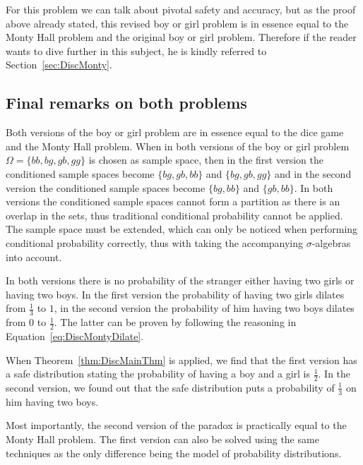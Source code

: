 \documentclass[a4paper]{report}
\theoremstyle{plain}
\theoremstyle{definition}
\theoremstyle{remark}
\numberwithin{equation}{chapter}
\DeclareMathOperator{\1}{\mathbbm{1}}
\begin{document}
For this problem we can talk about pivotal safety and accuracy, but as the proof above already stated, this revised boy or girl problem is in essence equal to the Monty Hall problem and the original boy or girl problem. Therefore if the reader wants to dive further in this subject, he is kindly referred to Section~\ref{sec:DiscMonty}.

\subsection{Final remarks on both problems}
Both versions of the boy or girl problem are in essence equal to the dice game and the Monty Hall problem. When in both versions of the boy or girl problem $\Omega=\{bb,bg,gb,gg\}$ is chosen as sample space, then in the first version the conditioned sample spaces become $\{bg, gb, bb\}$ and $\{bg, gb, gg\}$ and in the second version the conditioned sample spaces become $\{bg, bb\}$ and $\{gb, bb\}$. In both versions the conditioned sample spaces cannot form a partition as there is an overlap in the sets, thus traditional conditional probability cannot be applied. The sample space must be extended, which can only be noticed when performing conditional probability correctly, thus with taking the accompanying $\sigma$-algebras into account.

In both versions there is no probability of the stranger either having two girls or having two boys. In the first version the probability of having two girls dilates from $\frac{1}{3}$ to $1$, in the second version the probability of him having two boys dilates from $0$ to $\frac{1}{2}$. The latter can be proven by following the reasoning in Equation~\ref{eq:DiscMontyDilate}.

When Theorem~\ref{thm:DiscMainThm} is applied, we find that the first version has a safe distribution stating the probability of having a boy and a girl is $\frac{1}{2}$. In the second version, we found out that the safe distribution puts a probability of $\frac{1}{3}$ on him having two boys.

Most importantly, the second version of the paradox is practically equal to the Monty Hall problem. The first version can also be solved using the same techniques as the only difference being the model of probability distributions.
\end{document}
